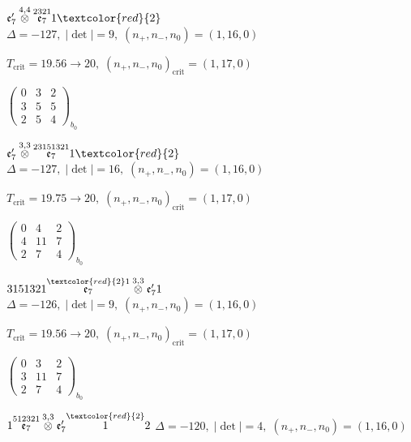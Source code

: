 \documentclass[10pt]{article}
\begin{document}
$\mathfrak{e}_7'\overset{4,4}{\otimes}\overset{2321}{\mathfrak{e}_7}1\textcolor{red}{2}$ \quad $\Delta=-127,\; |\det|=9,\; (n_+,n_-,n_0)=(1,16,0)$

\hspace{1em}$T_{\text{crit}}=19.56 \to 20,\; (n_+,n_-,n_0)_{\text{crit}}=(1,17,0)$

\hspace{2em}$\left(\begin{smallmatrix}0 & 3 & 2 \\ 3 & 5 & 5 \\ 2 & 5 & 4\end{smallmatrix}\right)_{\!b_0}$

\smallskip

$\mathfrak{e}_7'\overset{3,3}{\otimes}\overset{23151321}{\mathfrak{e}_7}1\textcolor{red}{2}$ \quad $\Delta=-127,\; |\det|=16,\; (n_+,n_-,n_0)=(1,16,0)$

\hspace{1em}$T_{\text{crit}}=19.75 \to 20,\; (n_+,n_-,n_0)_{\text{crit}}=(1,17,0)$

\hspace{2em}$\left(\begin{smallmatrix}0 & 4 & 2 \\ 4 & 11 & 7 \\ 2 & 7 & 4\end{smallmatrix}\right)_{\!b_0}$

\smallskip

$3151321\overset{\textcolor{red}{2}1}{\mathfrak{e}_7}\overset{3,3}{\otimes}\mathfrak{e}_7'1$ \quad $\Delta=-126,\; |\det|=9,\; (n_+,n_-,n_0)=(1,16,0)$

\hspace{1em}$T_{\text{crit}}=19.56 \to 20,\; (n_+,n_-,n_0)_{\text{crit}}=(1,17,0)$

\hspace{2em}$\left(\begin{smallmatrix}0 & 3 & 2 \\ 3 & 11 & 7 \\ 2 & 7 & 4\end{smallmatrix}\right)_{\!b_0}$

\smallskip

$1\overset{512321}{\mathfrak{e}_7}\overset{3,3}{\otimes}\mathfrak{e}_7'\overset{\textcolor{red}{2}}{1}2$ \quad $\Delta=-120,\; |\det|=4,\; (n_+,n_-,n_0)=(1,16,0)$
\end{document}

